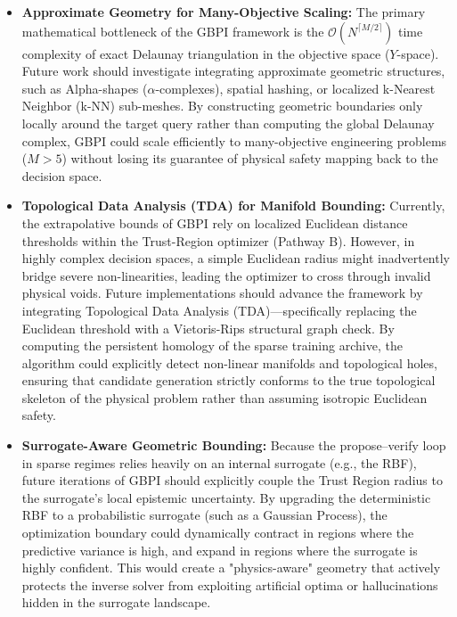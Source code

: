 \begin{itemize}
  \item \textbf{Approximate Geometry for Many-Objective Scaling:} 
  The primary mathematical bottleneck of the GBPI framework is the $\mathcal{O}(N^{\lceil M/2 \rceil})$ time complexity of exact Delaunay triangulation in the objective space ($Y$-space). Future work should investigate integrating approximate geometric structures, such as Alpha-shapes ($\alpha$-complexes), spatial hashing, or localized k-Nearest Neighbor (k-NN) sub-meshes. By constructing geometric boundaries only locally around the target query rather than computing the global Delaunay complex, GBPI could scale efficiently to many-objective engineering problems ($M > 5$) without losing its guarantee of physical safety mapping back to the decision space.

  \item \textbf{Topological Data Analysis (TDA) for Manifold Bounding:} 
  Currently, the extrapolative bounds of GBPI rely on localized Euclidean distance thresholds within the Trust-Region optimizer (Pathway B). However, in highly complex decision spaces, a simple Euclidean radius might inadvertently bridge severe non-linearities, leading the optimizer to cross through invalid physical voids.  Future implementations should advance the framework by integrating Topological Data Analysis (TDA)—specifically replacing the Euclidean threshold with a Vietoris-Rips structural graph check. By computing the persistent homology of the sparse training archive, the algorithm could explicitly detect non-linear manifolds and topological holes, ensuring that candidate generation strictly conforms to the true topological skeleton of the physical problem rather than assuming isotropic Euclidean safety.
  
  \item \textbf{Surrogate-Aware Geometric Bounding:} 
  Because the propose--verify loop in sparse regimes relies heavily on an internal surrogate (e.g., the RBF), future iterations of GBPI should explicitly couple the Trust Region radius to the surrogate's local epistemic uncertainty.  By upgrading the deterministic RBF to a probabilistic surrogate (such as a Gaussian Process), the optimization boundary could dynamically contract in regions where the predictive variance is high, and expand in regions where the surrogate is highly confident. This would create a "physics-aware" geometry that actively protects the inverse solver from exploiting artificial optima or hallucinations hidden in the surrogate landscape.
\end{itemize}

